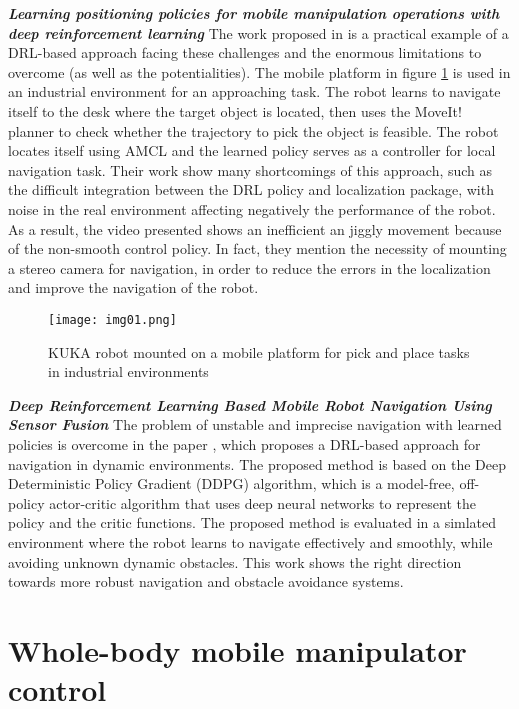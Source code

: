 \textbf{\textit{Learning positioning policies for mobile manipulation operations
		with deep reinforcement learning}}
\quad
The work proposed in \cite{iriondo2023learning} is a practical example of a DRL-based approach
facing these challenges and the enormous limitations to overcome (as well as the potentialities).
The mobile platform in figure \ref{fig:img01} is used in an industrial environment for an
approaching task. The robot learns to navigate itself to the desk where the target object is located,
then uses the MoveIt! planner to check whether the trajectory to pick the object is feasible.
The robot locates itself using AMCL and the learned policy serves as a controller for
local navigation task. Their work show many shortcomings of this approach, such as the
difficult integration between the DRL policy and localization package, with noise in the
real environment affecting negatively the performance of the robot. As a result,
the video presented shows an inefficient an jiggly movement
because of the non-smooth control policy. In fact, they mention the necessity of mounting
a stereo camera for navigation, in order to reduce the errors in the localization and
improve the navigation of the robot.


\begin{figure}[H]
	\centering
	\texttt{[image: img01.png]}
	\captionsetup{width=0.6\linewidth}
	\caption{KUKA robot mounted on a mobile platform for pick and place tasks
		in industrial environments \cite{iriondo2023learning}}
	\label{fig:img01}
\end{figure}



\textbf{\textit{Deep Reinforcement Learning Based Mobile Robot Navigation Using Sensor Fusion}} \quad
The problem of unstable and imprecise navigation with learned policies is overcome in the
paper \cite{yan2023drlnavigation}, which proposes a DRL-based approach for navigation in dynamic
environments. The proposed method is based on the Deep Deterministic Policy Gradient (DDPG)
algorithm, which is a model-free, off-policy actor-critic algorithm that uses deep neural networks
to represent the policy and the critic functions. The proposed method is evaluated in a
simlated environment where the robot learns to navigate effectively and smoothly, while avoiding
unknown dynamic obstacles. This work shows the right direction towards more robust
navigation and obstacle avoidance systems.

\section{Whole-body mobile manipulator control}

